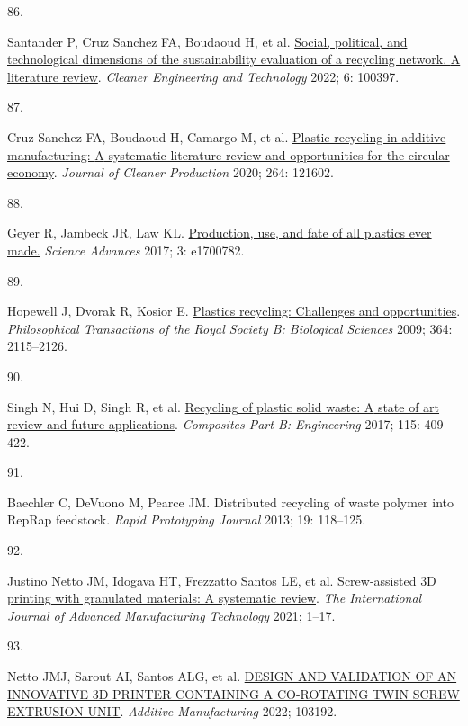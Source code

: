 \documentclass[
  12pt,
  a4paperpaper,
  onecolumn]{article}
\newlength{\cslhangindent}
\newlength{\csllabelwidth}
\newlength{\cslentryspacingunit} %
\newenvironment{CSLReferences}[2] %
 {%
  \setlength{\parindent}{0pt}
  \ifodd #1
  \let\oldpar\par
  \def\par{\hangindent=\cslhangindent\oldpar}
  \fi
  \setlength{\parskip}{#2\cslentryspacingunit}
 }%
 {}
\newcommand{\CSLLeftMargin}[1]{\parbox[t]{\csllabelwidth}{#1}}
\newcommand{\CSLRightInline}[1]{\parbox[t]{\linewidth - \csllabelwidth}{#1}\break}
\begin{document}
\begin{CSLReferences}{0}{0}
\leavevmode{}%
\CSLLeftMargin{86. }%
\CSLRightInline{Santander P, Cruz Sanchez FA, Boudaoud H, et al.
\href{https://doi.org/10.1016/j.clet.2022.100397}{Social, political, and
technological dimensions of the sustainability evaluation of a recycling
network. {A} literature review}. \emph{Cleaner Engineering and
Technology} 2022; 6: 100397.}

\leavevmode{}%
\CSLLeftMargin{87. }%
\CSLRightInline{Cruz Sanchez FA, Boudaoud H, Camargo M, et al.
\href{https://doi.org/10.1016/j.jclepro.2020.121602}{Plastic recycling
in additive manufacturing: {A} systematic literature review and
opportunities for the circular economy}. \emph{Journal of Cleaner
Production} 2020; 264: 121602.}

\leavevmode{}%
\CSLLeftMargin{88. }%
\CSLRightInline{Geyer R, Jambeck JR, Law KL.
\href{https://doi.org/10.1126/sciadv.1700782}{Production, use, and fate
of all plastics ever made.} \emph{Science Advances} 2017; 3: e1700782.}

\leavevmode{}%
\CSLLeftMargin{89. }%
\CSLRightInline{Hopewell J, Dvorak R, Kosior E.
\href{https://doi.org/10.1098/rstb.2008.0311}{Plastics recycling:
Challenges and opportunities}. \emph{Philosophical Transactions of the
Royal Society B: Biological Sciences} 2009; 364: 2115--2126.}

\leavevmode{}%
\CSLLeftMargin{90. }%
\CSLRightInline{Singh N, Hui D, Singh R, et al.
\href{https://doi.org/10.1016/j.compositesb.2016.09.013}{Recycling of
plastic solid waste: {A} state of art review and future applications}.
\emph{Composites Part B: Engineering} 2017; 115: 409--422.}

\leavevmode{}%
\CSLLeftMargin{91. }%
\CSLRightInline{Baechler C, DeVuono M, Pearce JM. {Distributed recycling
of waste polymer into RepRap feedstock}. \emph{Rapid Prototyping
Journal} 2013; 19: 118--125.}

\leavevmode{}%
\CSLLeftMargin{92. }%
\CSLRightInline{Justino Netto JM, Idogava HT, Frezzatto Santos LE, et
al. \href{https://doi.org/10.1007/s00170-021-07365-z}{Screw-assisted
{3D} printing with granulated materials: A systematic review}. \emph{The
International Journal of Advanced Manufacturing Technology} 2021;
1--17.}

\leavevmode{}%
\CSLLeftMargin{93. }%
\CSLRightInline{Netto JMJ, Sarout AI, Santos ALG, et al.
\href{https://doi.org/10.1016/j.addma.2022.103192}{{DESIGN AND
VALIDATION OF AN INNOVATIVE 3D PRINTER CONTAINING A CO-ROTATING TWIN
SCREW EXTRUSION UNIT}}. \emph{Additive Manufacturing} 2022; 103192.}


\end{CSLReferences}
\end{document}
